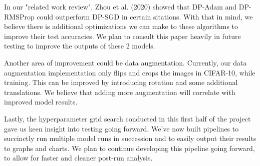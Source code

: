 In our "related work review", Zhou et al. (2020) \cite{zhou_2020_private_adaptive_algorithms} showed that DP-Adam and DP-RMSProp could outperform DP-SGD in certain 
sitations. With that in mind, we believe there is additional optimizations we can make to these algorithms to improve their test accuracies. We plan to consult this
paper heavily in future testing to improve the outputs of these 2 models.

Another area of improvement could be data augmentation. Currently, our data augmentation implementation only flips and crops the images in CIFAR-10, while training. 
This can be improved by introducing rotation and some additional translations. We believe that adding more augmentation will correlate with improved model results.

Lastly, the hyperparameter grid search conducted in this first half of the project gave us keen insight into testing going forward. We've now built pipelines to
succinctly run multiple model runs in succession and to easily output their results to graphs and charts. We plan to continue developing this pipeline going forward, to allow 
for faster and cleaner post-run analysis.


